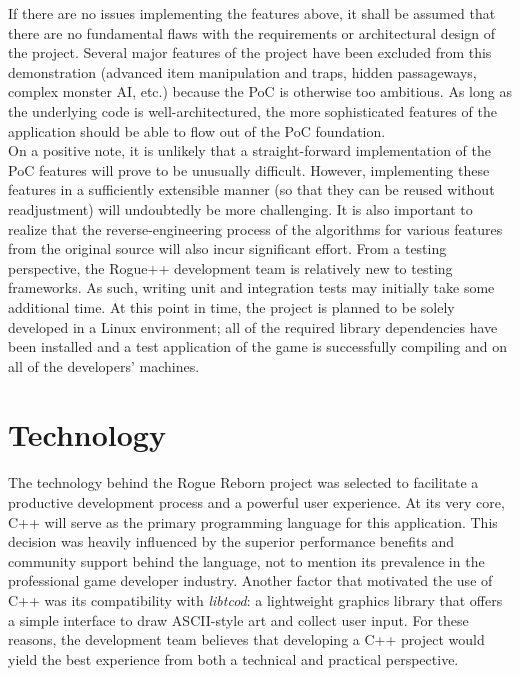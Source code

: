 \documentclass{article}
\begin{document}
If there are no issues implementing the features above, it shall be assumed that there are no fundamental flaws with the requirements or architectural design of the project.  Several major features of the project have been excluded from this demonstration (advanced item manipulation and traps, hidden passageways, complex monster AI, etc.) because the PoC is otherwise too ambitious.  As long as the underlying code is well-architectured, the more sophisticated features of the application should be able to flow out of the PoC foundation.\\	

On a positive note, it is unlikely that a straight-forward implementation of the PoC features will prove to be unusually difficult.  However, implementing these features in a sufficiently extensible manner (so that they can be reused without readjustment) will undoubtedly be more challenging.  It is also important to realize that the reverse-engineering process of the algorithms for various features from the original source will also incur significant effort.  From a testing perspective, the Rogue++ development team is relatively new to testing frameworks.  As such, writing unit and integration tests may initially take some additional time.  At this point in time, the project is planned to be solely developed in a Linux environment; all of the required library dependencies have been installed and a test application of the game is successfully compiling and on all of the developers' machines.

\section{Technology}
\label{tech_label}

\indent
The technology behind the Rogue Reborn project was selected to facilitate a productive development process and a powerful user experience. At its very core, C++ will serve as the primary programming language for this application.  This decision was heavily influenced by the superior performance benefits and community support behind the language, not to mention its prevalence in the professional game developer industry.  Another factor that motivated the use of C++ was its compatibility with \textit{libtcod}: a lightweight graphics library that offers a simple interface to draw ASCII-style art and collect user input.  For these reasons, the development team believes that developing a C++ project would yield the best experience from both a technical and practical perspective.\\
\end{document}
